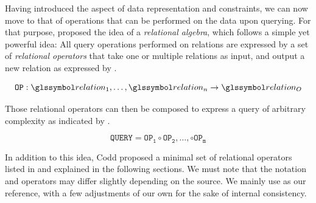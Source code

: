 Having introduced the aspect of data representation and constraints, we can now move to that of operations that can be performed on the data upon querying. For that purpose, \cite{Codd:1970Relational} proposed the idea of a \emph{relational algebra}, which follows a simple yet powerful idea: All query operations performed on relations are expressed by a set of \emph{relational operators} that take one or multiple relations as input, and output a new relation as expressed by .

\begin{equation}
    \label{equation:rel_op}
    \mathtt{OP}: \relation_1, \ldots, \relation_n \rightarrow \relation_{O}
\end{equation}

Those relational operators can then be composed to express a query of arbitrary complexity as indicated by .

\begin{equation}
    \label{equation:rel_query}
    \mathtt{QUERY} = \mathtt{OP_{1}} \circ \mathtt{OP_{2}}, \ldots , \circ \mathtt{OP_{m}}
\end{equation}

In addition to this idea, Codd proposed a minimal set of relational operators listed in  and explained in the following sections. We must note that the notation and operators may differ slightly depending on the source. We mainly use \cite{Garcia:2009Database} as our reference, with a few adjustments of our own for the sake of internal consistency.

